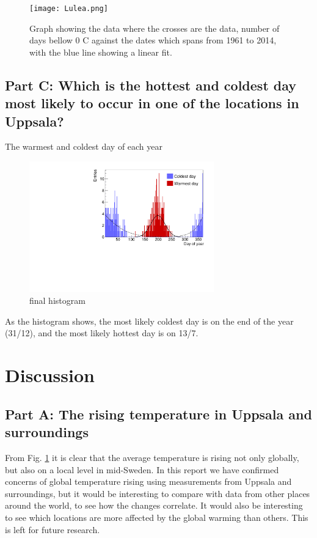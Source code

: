 \documentclass[a4paper]{article}
\begin{document}
\begin{figure}[H]
   \centering
  \texttt{[image: Lulea.png]}
    \caption{Graph showing the data where the crosses are the data, number of days bellow 0 C \degree against the dates which spans from 1961 to 2014, with the blue line showing a linear fit. }
   \label{fig:year}
\end{figure}

\subsection{Part C: Which is the hottest and coldest day most likely to occur in one of the locations in Uppsala?}

\item The warmest and coldest day of each year
\begin{figure}[H]
    \centering
    \includegraphics[width=8cm]{./images/hotCold_Upp_final}
    \caption{final histogram}
    \label{fig:hist}
\end{figure}
As the histogram shows, the most likely coldest day is on the end of the year (31/12), and the most likely hottest day is on 13/7.

\section{Discussion}\label{sec:discussion}
\subsection{Part A: The rising temperature in Uppsala and surroundings}
From Fig. \ref{fig:year} it is clear that the average temperature is rising not only globally, but also on a local level in mid-Sweden. In this report we have confirmed concerns of global temperature rising using measurements from Uppsala and surroundings, but it would be interesting to compare with data from other places around the world, to see how the changes correlate. It would also be interesting to see which locations are more affected by the global warming than others. This is left for future research.
\end{document}
